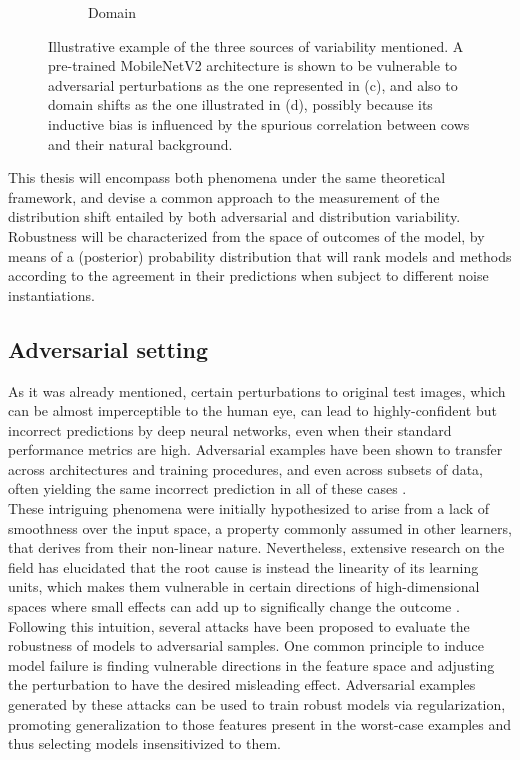 \begin{figure}[H]
\begin{subfigure}[b]{0.22\textwidth}
        \caption{Domain}
    \end{subfigure}
       \caption{Illustrative example of the three sources of variability
       mentioned. A pre-trained MobileNetV2 
       architecture is shown to be vulnerable to adversarial perturbations 
       as the one represented in (c), and also to domain shifts 
       as the one illustrated in (d), possibly because its inductive bias is influenced
       by the spurious correlation between cows and their natural background.}
       \label{fig:cows}
\end{figure}

This thesis will encompass both phenomena under the same theoretical
framework, and devise a common approach to the measurement of
the distribution shift entailed by both adversarial and distribution
variability. Robustness will be characterized from the space of
outcomes of the model, by means of a (posterior) probability 
distribution that will rank models and methods according to the
agreement in their predictions when subject to different noise instantiations.

\subsection{Adversarial setting}

As it was already mentioned, certain perturbations to
original test images, which can be almost imperceptible
to the human eye, can lead to highly-confident but
incorrect predictions by deep neural networks, even when their
standard performance metrics are high.
Adversarial examples have been shown to transfer
across architectures and training procedures, and
even across subsets of data,
often yielding the same incorrect prediction in
all of these cases \cite{szegedyIntriguingPropertiesNeural2014}. \\

These intriguing phenomena were initially hypothesized to arise 
from a lack of smoothness over the input space, a property
commonly assumed in other learners, that derives from their
non-linear nature. Nevertheless,
extensive research on the field has elucidated that the root
cause is instead the linearity of its learning units, which makes them
vulnerable in certain directions of high-dimensional
spaces where small
effects can add up to significally change the outcome
\cite{goodfellowExplainingHarnessingAdversarial2015}. \\

Following this intuition, several attacks have been proposed
to evaluate the robustness of models to adversarial samples. One common
principle to induce model failure is finding vulnerable directions in
the feature space and adjusting the perturbation to have
the desired misleading effect.  Adversarial examples generated
by these attacks can be used to train robust models via regularization,
promoting generalization to those features present in the worst-case
examples and thus selecting models insensitivized
to them. \\


